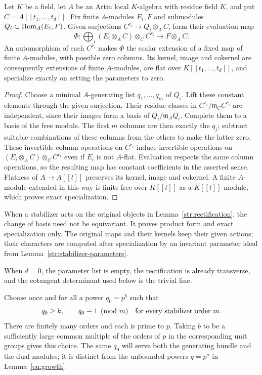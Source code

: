 \begin{lemma}\label{str:rectification}
Let $K$ be a field, let $A$ be an Artin local $K$-algebra with residue
field $K$, and put $C=A[[t_1,\ldots,t_d]]$.  Fix finite $A$-modules
$E_i,F$ and submodules
$Q_i\subset\operatorname{Hom}_A(E_i,F)$.  Given surjections
$C^{r_i}\to Q_i\otimes_A C$, form their evaluation map
\[
 \Phi:\bigoplus_i(E_i\otimes_A C)\otimes_C C^{r_i}
                   \longrightarrow F\otimes_A C.
\]
An automorphism of each $C^{r_i}$ makes $\Phi$ the scalar extension of
a fixed map of finite $A$-modules, with possible zero columns.  Its
kernel, image and cokernel are consequently extensions of finite
$A$-modules, are flat over $K[[t_1,\ldots,t_d]]$, and specialize
exactly on setting the parameters to zero.
\end{lemma}

\begin{proof}
Choose a minimal $A$-generating list $q_1,\ldots,q_m$ of $Q_i$.
Lift these constant elements through the given surjection.  Their
residue classes in $C^{r_i}/\mathfrak m_CC^{r_i}$ are independent,
since their images form a basis of $Q_i/\mathfrak m_AQ_i$.  Complete
them to a basis of the free module.  The first $m$ columns are then
exactly the $q_j$; subtract suitable combinations of these columns
from the others to make the latter zero.  These invertible column
operations on $C^{r_i}$ induce invertible operations on
$(E_i\otimes_A C)\otimes_C C^{r_i}$ even if $E_i$ is not $A$-flat.
Evaluation respects the same column operations, so the resulting map
has constant coefficients in the asserted sense.  Flatness of
$A\to A[[t]]$ preserves its kernel, image and cokernel.  A finite
$A$-module extended in this way is finite free over $K[[t]]$ as a
$K[[t]]$-module, which proves exact specialization.
\end{proof}

When a stabilizer acts on the original objects in
Lemma~\ref{str:rectification}, the change of basis need not be
equivariant.  It proves product form and exact specialization only.
The original maps and their kernels keep their given actions; their
characters are computed after specialization by an invariant parameter
ideal from Lemma~\ref{str:stabilizer-parameters}.

When $d=0$, the parameter list is empty, the rectification is already
transverse, and the cotangent determinant used below is the trivial line.

Choose once and for all a power $q_0=p^b$ such that
\begin{equation}\label{eu:frobenius-choice}
     q_0\ge k,\qquad q_0\equiv1\pmod m
       \quad\hbox{for every stabilizer order }m.
\end{equation}
There are finitely many orders and each is prime to $p$.  Taking $b$
to be a sufficiently large common multiple of the orders of $p$ in
the corresponding unit groups gives this choice.  The same $q_0$ will
serve both the generating bundle and the dual modules; it is distinct
from the unbounded powers $q=p^a$ in Lemma~\ref{eu:growth}.

